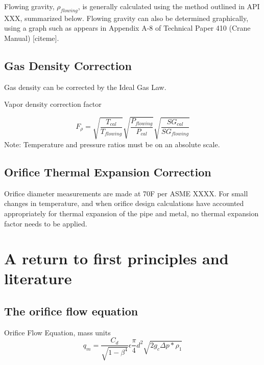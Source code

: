 \documentclass{article}
\begin{document}
Flowing gravity, $\rho_{flowing}$, is generally calculated using the method outlined in API XXX, summarized below. Flowing gravity can also be determined graphically, using a graph such as appears in Appendix A-8 of Technical Paper 410 (Crane Manual) [citeme].


\subsection{Gas Density Correction}

Gas density can be corrected by the Ideal Gas Law.

\begin{proposition}Vapor density correction factor 

\begin{equation}
    F_{\rho} = \sqrt{\frac{T_{cal}}{T_{flowing}}}\sqrt{\frac{P_{flowing}}{P_{cal}}}\sqrt{\frac{SG_{cal}}{SG_{flowing}}}
\end{equation}
Note: Temperature and pressure ratios must be on an absolute scale.
\end{proposition}



\subsection{Orifice Thermal Expansion Correction}
Orifice diameter measurements are made at 70\degree F per ASME XXXX. For small changes in temperature, and when orifice design calculations have accounted appropriately for thermal expansion of the pipe and metal, no thermal expansion factor needs to be applied.








\newpage
\section{A return to first principles and literature}
\subsection{The orifice flow equation}
\begin{principle}
Orifice Flow Equation, mass units
    \begin{equation}
        q_m =  \frac{C_d}{\sqrt{1-\beta^4}}\epsilon\frac{\pi}{4}d^2 \sqrt{2 g_c \Delta p * \rho_1}
    \end{equation}
\end{principle}
\end{document}
